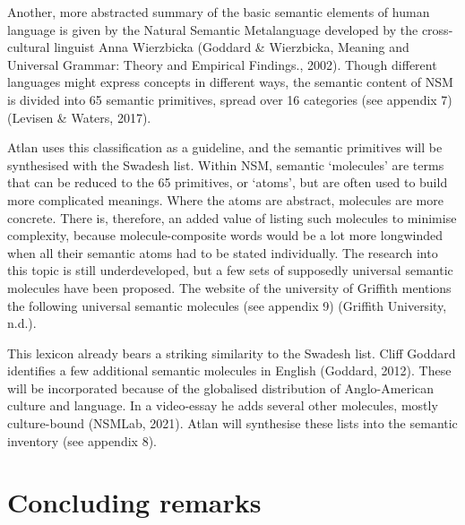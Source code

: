 Another, more abstracted summary of the basic semantic elements of human language is given by the Natural Semantic Metalanguage developed by the cross-cultural linguist Anna Wierzbicka (Goddard \& Wierzbicka, Meaning and Universal Grammar: Theory and Empirical Findings., 2002). Though different languages might express concepts in different ways, the semantic content of NSM is divided into 65 semantic primitives, spread over 16 categories (see appendix 7) (Levisen \& Waters, 2017). 

Atlan uses this classification as a guideline, and the semantic primitives will be synthesised with the Swadesh list. Within NSM, semantic ‘molecules’ are terms that can be reduced to the 65 primitives, or ‘atoms’, but are often used to build more complicated meanings. Where the atoms are abstract, molecules are more concrete. There is, therefore, an added value of listing such molecules to minimise complexity, because molecule-composite words would be a lot more longwinded when all their semantic atoms had to be stated individually. The research into this topic is still underdeveloped, but a few sets of supposedly universal semantic molecules have been proposed. The website of the university of Griffith mentions the following universal semantic molecules (see appendix 9) (Griffith University, n.d.).  

This lexicon already bears a striking similarity to the Swadesh list. Cliff Goddard identifies a few additional semantic molecules in English (Goddard, 2012). These will be incorporated because of the globalised distribution of Anglo-American culture and language. In a video-essay he adds several other molecules, mostly culture-bound (NSMLab, 2021). Atlan will synthesise these lists into the semantic inventory (see appendix 8).  

 

\section{Concluding remarks}

